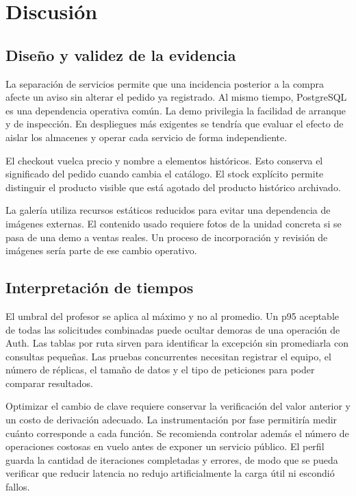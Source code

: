 \documentclass[conference]{IEEEtran}
\begin{document}
\clearpage
\section{Discusión}
\subsection{Diseño y validez de la evidencia}
La separación de servicios permite que una incidencia posterior a la compra afecte un aviso sin alterar el pedido ya registrado. Al mismo tiempo, PostgreSQL es una dependencia operativa común. La demo privilegia la facilidad de arranque y de inspección. En despliegues más exigentes se tendría que evaluar el efecto de aislar los almacenes y operar cada servicio de forma independiente.

El checkout vuelca precio y nombre a elementos históricos. Esto conserva el significado del pedido cuando cambia el catálogo. El stock explícito permite distinguir el producto visible que está agotado del producto histórico archivado.

La galería utiliza recursos estáticos reducidos para evitar una dependencia de imágenes externas. El contenido usado requiere fotos de la unidad concreta si se pasa de una demo a ventas reales. Un proceso de incorporación y revisión de imágenes sería parte de ese cambio operativo.

\subsection{Interpretación de tiempos}
El umbral del profesor se aplica al máximo y no al promedio. Un p95 aceptable de todas las solicitudes combinadas puede ocultar demoras de una operación de Auth. Las tablas por ruta sirven para identificar la excepción sin promediarla con consultas pequeñas. Las pruebas concurrentes necesitan registrar el equipo, el número de réplicas, el tamaño de datos y el tipo de peticiones para poder comparar resultados.

Optimizar el cambio de clave requiere conservar la verificación del valor anterior y un costo de derivación adecuado. La instrumentación por fase permitiría medir cuánto corresponde a cada función. Se recomienda controlar además el número de operaciones costosas en vuelo antes de exponer un servicio público. El perfil guarda la cantidad de iteraciones completadas y errores, de modo que se pueda verificar que reducir latencia no redujo artificialmente la carga útil ni escondió fallos.
\end{document}
